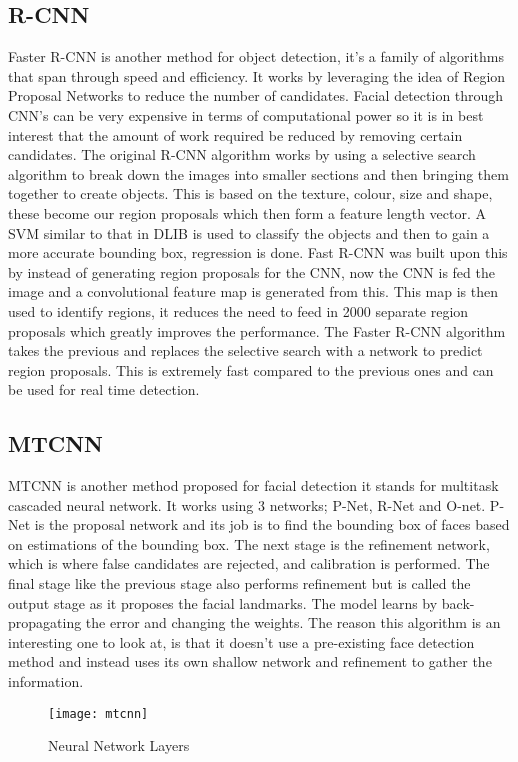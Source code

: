 \documentclass{article}
\begin{document}
\subsection{R-CNN}
Faster R-CNN \cite{Ren2017} is another method for object detection, it’s a family of
algorithms that span through speed and efficiency. It works by leveraging the idea of Region
Proposal Networks to reduce the number of candidates. Facial detection through CNN’s can
be very expensive in terms of computational power so it is in best interest that the amount of
work required be reduced by removing certain candidates. The original R-CNN algorithm
works by using a selective search algorithm to break down the images into smaller sections
and then bringing them together to create objects. This is based on the texture, colour, size
and shape, these become our region proposals which then form a feature length vector. A
SVM similar to that in DLIB is used to classify the objects and then to gain a more accurate
bounding box, regression is done. Fast R-CNN was built upon this by instead of generating
region proposals for the CNN, now the CNN is fed the image and a convolutional feature map
is generated from this. This map is then used to identify regions, it reduces the need to feed
in 2000 separate region proposals which greatly improves the performance. The Faster R-CNN
algorithm takes the previous and replaces the selective search with a network to predict region
proposals. This is extremely fast compared to the previous ones and can be used for real time
detection.
\subsection{MTCNN}
MTCNN \cite{Zhang2016} is another method proposed for facial detection it stands for
multitask cascaded neural network. It works using 3 networks; P-Net, R-Net and O-net. P-Net
is the proposal network and its job is to find the bounding box of faces based on estimations
of the bounding box. The next stage is the refinement network, which is where false candidates
are rejected, and calibration is performed. The final stage like the previous stage also performs
refinement but is called the output stage as it proposes the facial landmarks. The model learns
by back-propagating the error and changing the weights. The reason this algorithm is an
interesting one to look at, is that it doesn’t use a pre-existing face detection method and
instead uses its own shallow network and refinement to gather the information.
\begin{figure}[h!]
\centering
\texttt{[image: mtcnn]}
\caption{Neural Network Layers}
\label{fig:mtcnn}
\end{figure}
\end{document}
